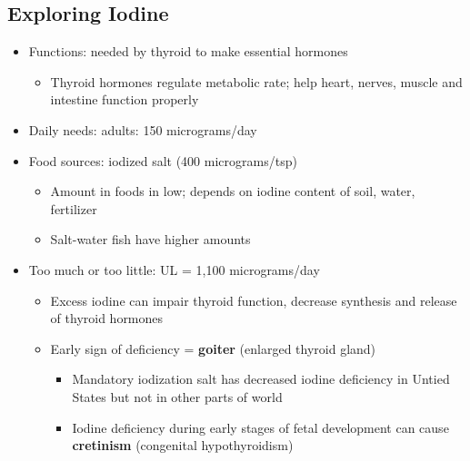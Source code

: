 \documentclass[12pt]{article}
\begin{document}
        \subsection{Exploring Iodine}
            \begin{itemize}
                \item Functions: needed by thyroid to make essential hormones
                    \begin{itemize}
                        \item Thyroid hormones regulate metabolic rate; help heart, nerves, muscle and intestine function properly
                    \end{itemize}
                \item Daily needs: adults: 150 micrograms/day
                \item Food sources: iodized salt (400 micrograms/tsp)
                    \begin{itemize}
                        \item Amount in foods in low; depends on iodine content of soil, water, fertilizer
                        \item Salt-water fish have higher amounts
                    \end{itemize}
                \item Too much or too little: UL = 1,100 micrograms/day
                    \begin{itemize}
                        \item Excess iodine can impair thyroid function, decrease synthesis and release of thyroid hormones
                        \item Early sign of deficiency = \textbf{goiter} (enlarged thyroid gland)
                            \begin{itemize}
                                \item Mandatory iodization salt has decreased iodine deficiency in Untied States but not in other parts of world
                                \item Iodine deficiency during early stages of fetal development can cause \textbf{cretinism} (congenital hypothyroidism)
                            \end{itemize}
                    \end{itemize}
            \end{itemize}
\end{document}
